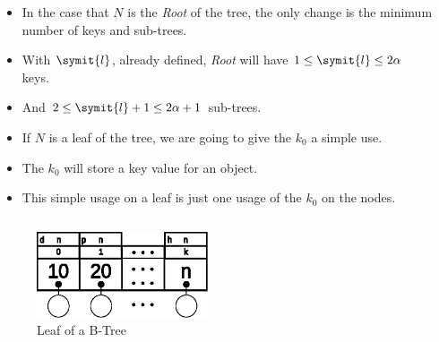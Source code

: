 \documentclass{beamer}
\begin{document}
\begin{frame}
    \begin{columns}
        \begin{column}{\textlecolumn}
            \begin{block}{}
                \begin{itemize}
                    \item In the case that \(N\) is the \emph{Root} of the tree, the only change is the minimum number of keys and sub-trees.
                    \item With \(\symit{l}\), already defined, \emph{Root} will have \(1 \leq \symit{l} \leq 2\alpha\) keys.
                    \item And \(2 \leq \symit{l} + 1 \leq 2\alpha + 1\) sub-trees.
                \end{itemize}
                \begin{itemize}
                    \item If \(N\) is a leaf of the tree, we are going to give the \(k_0\) a simple use.
                    \item The \(k_0\) will store a key value for an object.
                    \item This simple usage on a leaf is just one usage of the \(k_0\) on the nodes.
                \end{itemize}
            \end{block}
        \end{column}
        \begin{column}{\textricolumn}
            \begin{block}{}
            \end{block}
        \end{column}
    \end{columns}
    \begin{figure}
        \includegraphics[width=0.45\textwidth]{resources/made/single_leaf.eps}
        \caption[]{Leaf of a B-Tree}
    \end{figure}

    \framebreak


\end{frame}
\end{document}
